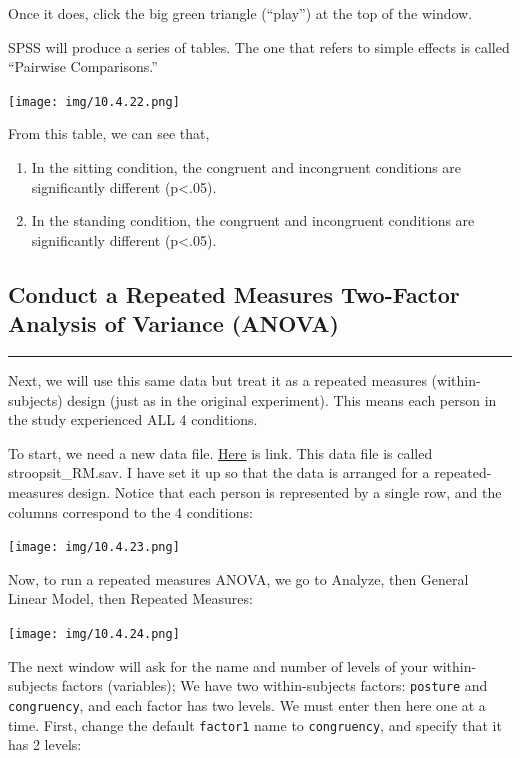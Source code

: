 \documentclass[]{book}
\providecommand{\tightlist}{%
  \setlength{\itemsep}{0pt}\setlength{\parskip}{0pt}}
\begin{document}
Once it does, click the big green triangle (``{play}'') at the top of
the window.

SPSS will produce a series of tables. The one that refers to simple
effects is called ``Pairwise Comparisons.''

\texttt{[image: img/10.4.22.png]}

From this table, we can see that,

\begin{enumerate}
\def\labelenumi{\arabic{enumi}.}
\tightlist
\item
  In the sitting condition, the congruent and incongruent conditions are
  significantly different (p\textless{}.05).
\item
  In the standing condition, the congruent and incongruent conditions
  are significantly different (p\textless{}.05).
\end{enumerate}

\subsection{Conduct a Repeated Measures Two-Factor Analysis of Variance
(ANOVA)}\label{conduct-a-repeated-measures-two-factor-analysis-of-variance-anova}

\begin{center}\rule{0.5\linewidth}{0.5pt}\end{center}

Next, we will use this same data but treat it as a repeated measures
(within-subjects) design (just as in the original experiment). This
means each person in the study experienced ALL 4 conditions.

To start, we need a new data file.
\href{https://github.com/CrumpLab/statisticsLab/blob/master/data/spssdata/stroopsit_RM.sav}{Here}
is link. This data file is called stroopsit\_RM.sav. I have set it up so
that the data is arranged for a repeated-measures design. Notice that
each person is represented by a single row, and the columns correspond
to the 4 conditions:

\texttt{[image: img/10.4.23.png]}

Now, to run a repeated measures ANOVA, we go to {Analyze}, then {General
Linear Model}, then {Repeated Measures}:

\texttt{[image: img/10.4.24.png]}

The next window will ask for the name and number of levels of your
within-subjects factors (variables); We have two within-subjects
factors: \texttt{posture} and \texttt{congruency}, and each factor has
two levels. We must enter then here one at a time. First, change the
default \texttt{factor1} name to \texttt{congruency}, and specify that
it has 2 levels:
\end{document}
